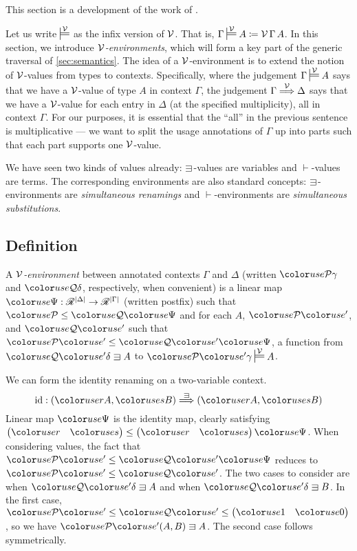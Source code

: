 This section is a development of the work of \citet{WA20}.

Let us write $\sdtstile{}\V$ as the infix version of $\mathcal V$.
That is, $\Gamma \sdtstile{}\V A \coloneqq \V\,\Gamma\,A$.
In this section, we introduce \emph{$\mathcal V$-environments}, which will form a key
part of the generic traversal of \cref{sec:semantics}.
The idea of a $\mathcal V$-environment is to extend the notion of $\mathcal V$-values from
types to contexts.
Specifically, where the judgement $\Gamma \sdtstile{}\V A$ says that we
have a $\mathcal V$-value of type $A$ in context $\Gamma$, the judgement
$\Gamma \stackrel{\mathcal V}\Longrightarrow \Delta$ says that we have a $\mathcal V$-value for each entry in
$\Delta$ (at the specified multiplicity), all in context $\Gamma$.
For our purposes, it is essential that the ``all'' in the previous sentence is
multiplicative --- we want to split the usage annotations of $\Gamma$ up into
parts such that each part supports one $\mathcal V$-value.

We have seen two kinds of values already: $\sqni$-values are variables and
$\vdash$-values are terms.
The corresponding environments are also standard concepts: $\sqni$-environments
are \emph{simultaneous renamings} and $\vdash$-environments are
\emph{simultaneous substitutions}.

\subsection{Definition}

\begin{definition}\label{def:lr-env}
  A \emph{$\mathcal V$-environment} between annotated contexts $\Gamma$ and $\Delta$
  (written $\grP\gamma$ and $\grQ\delta$, respectively, when convenient)
  is a linear map $\gr\Psi : \Ann^{\size\Delta} \to \Ann^{\size\Gamma}$ (written
  postfix) such that $\grP \leq \grQ\gr\Psi$ and for each $A$, $\grPprime$, and
  $\grQprime$ such that $\grPprime \leq \grQprime\gr\Psi$, a function from
  $\grQprime\delta \sqni A$ to $\grPprime\gamma \sdtstile{}\V A$.
\end{definition}

\begin{example}
  We can form the identity renaming on a two-variable context.
  \[
    \id : \plr{\gr rA, \gr sB} \env\sqni \plr{\gr rA, \gr sB}
  \]
  Linear map $\gr\Psi$ is the identity map, clearly satisfying
  \(
    \begin{pmatrix} \gr r & \gr s \end{pmatrix} \leq
    \begin{pmatrix} \gr r & \gr s \end{pmatrix}\gr\Psi
  \).
  When considering values, the fact that $\grPprime \leq \grQprime\gr\Psi$
  reduces to $\grPprime \leq \grQprime$.
  The two cases to consider are when $\grQprime\delta \sqni A$ and when
  $\grQprime\delta \sqni B$.
  In the first case, $\grPprime \leq \grQprime \leq
  \begin{pmatrix} \gr1 & \gr0 \end{pmatrix}$, so we have
  $\grPprime\plr{A, B} \sqni A$.
  The second case follows symmetrically.
\end{example}

